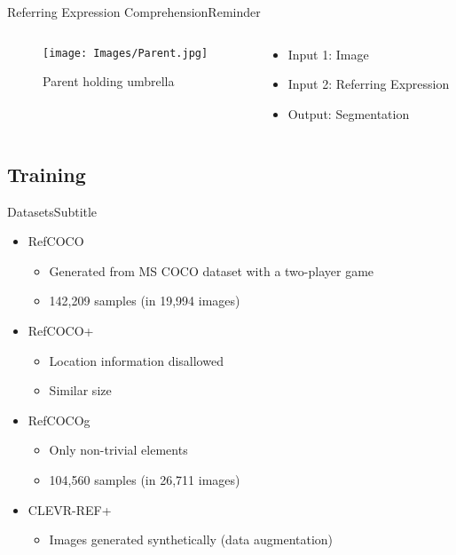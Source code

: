 \documentclass{beamer}
\begin{document}
\begin{frame}{Referring Expression Comprehension}{Reminder}
  \begin{columns}
    \begin{column}{.5\textwidth}
      \begin{figure}
        \texttt{[image: Images/Parent.jpg]}
        \caption{Parent holding umbrella}
      \end{figure}
    \end{column}
    \begin{column}{.5\textwidth}
      \begin{itemize}
        \item Input 1: Image
        \item Input 2: Referring Expression
        \item Output: Segmentation
      \end{itemize}
    \end{column}
  \end{columns}
\end{frame}


\subsection{Training}

\begin{frame}{Datasets}{Subtitle}
  \begin{itemize}
    \item RefCOCO
    \begin{itemize}
      \item Generated from MS COCO dataset with a two-player game
      \item 142,209 samples (in 19,994 images)
    \end{itemize}
    \item RefCOCO+
    \begin{itemize}
      \item \alert{Location} information disallowed
      \item Similar size
    \end{itemize}
    \item RefCOCOg
    \begin{itemize}
      \item Only non-trivial elements
      \item 104,560 samples (in 26,711 images)
    \end{itemize}
    \item CLEVR-REF+
    \begin{itemize}
      \item Images generated synthetically (data augmentation)
    \end{itemize}
  \end{itemize}
\end{frame}
\end{document}

